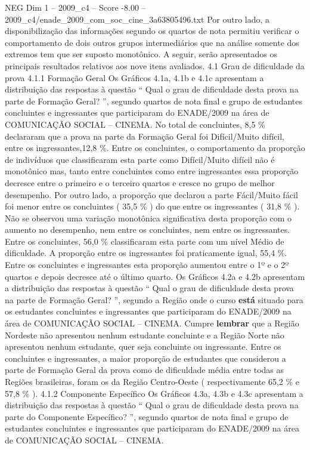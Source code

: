 \begin{textsample}{NEG Dim 1 – 2009\_c4 – Score -8.00 – 2009\_c4/enade\_2009\_com\_soc\_cine\_3a63805496.txt}
Por outro lado, a disponibilização das informações segundo os quartos de nota permitiu verificar o comportamento de dois outros grupos intermediários que na análise somente dos extremos tem que ser suposto monotônico.
A seguir, serão apresentados os principais resultados relativos aos nove itens avaliados. 4.1 Grau de dificuldade da prova 4.1.1 Formação Geral Os Gráficos 4.1a, 4.1b e 4.1c apresentam a distribuição das respostas à questão “ Qual o grau de dificuldade desta prova na parte de Formação Geral? ”, segundo quartos de nota final e grupo de estudantes concluintes e ingressantes que participaram do ENADE/2009 na área de COMUNICAÇÃO SOCIAL – CINEMA.
No total de concluintes, 8,5 \% declararam que a prova na parte da Formação Geral foi Difícil/Muito difícil, entre os ingressantes,12,8 \%.
Entre os concluintes, o comportamento da proporção de indivíduos que classificaram esta parte como Difícil/Muito difícil não é monotônico mas, tanto entre concluintes como entre ingressantes essa proporção decresce entre o primeiro e o terceiro quartos e cresce no grupo de melhor desempenho.
Por outro lado, a proporção que declarou a parte Fácil/Muito fácil foi menor entre os concluintes ( 35,5 \% ) do que entre os ingressantes ( 31,8 \% ).
Não se observou uma variação monotônica significativa desta proporção com o aumento no desempenho, nem entre os concluintes, nem entre os ingressantes.
Entre os concluintes, 56,0 \% classificaram esta parte com um nível Médio de dificuldade.
A proporção entre os ingressantes foi praticamente igual, 55,4 \%.
Entre os concluintes e ingressantes esta proporção aumentou entre o 1º e o 2º quartos e depois decresce até o último quarto.
Os Gráficos 4.2a e 4.2b apresentam a distribuição das respostas à questão “ Qual o grau de dificuldade desta prova na parte de Formação Geral? ”, segundo a Região onde o curso \textbf{está} situado para os estudantes concluintes e ingressantes que participaram do ENADE/2009 na área de COMUNICAÇÃO SOCIAL – CINEMA.
Cumpre \textbf{lembrar} que a Região Nordeste não apresentou nenhum estudante concluinte e a Região Norte não apresentou nenhum estudante, quer seja concluinte ou ingressante.
Entre os concluintes e ingressantes, a maior proporção de estudantes que considerou a parte de Formação Geral da prova como de dificuldade média entre todas as Regiões brasileiras, foram os da Região Centro-Oeste ( respectivamente 65,2 \% e 57,8 \% ). 4.1.2 Componente Específico Os Gráficos 4.3a, 4.3b e 4.3c apresentam a distribuição das respostas à questão “ Qual o grau de dificuldade desta prova na parte do Componente Específico? ”, segundo quartos de nota final e grupo de estudantes concluintes e ingressantes que participaram do ENADE/2009 na área de COMUNICAÇÃO SOCIAL – CINEMA.

\end{textsample}
